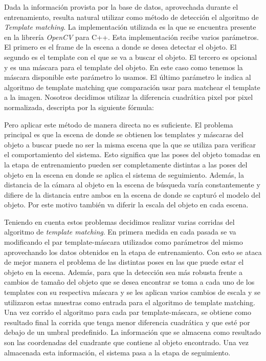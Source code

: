 
Dada la información provista por la base de datos, aprovechada durante el entrenamiento, resulta natural utilizar como método de detección el algoritmo de \textit{Template matching}.  La implementación utilizada es la que se encuentra presente en la librería \textit{OpenCV} para C++. Esta implementación recibe varios parámetros. El primero es el frame de la escena a donde se desea detectar el objeto. El segundo es el template con el que se va a buscar el objeto. El tercero es opcional y es una máscara para el template del objeto. En este caso como tenemos la máscara disponible este parámetro lo usamos. El último parámetro le indica al algoritmo de template matching que comparación usar para matchear el template a la imagen. Nosotros decidimos utilizar la diferencia cuadrática pixel por pixel normalizada, descripta por la siguiente fórmula:

Pero aplicar este método de manera directa no es suficiente. El problema principal es que la escena de donde se obtienen los templates y máscaras del objeto a buscar puede no ser la misma escena que la que se utiliza para verificar el comportamiento del sistema. Esto significa que las poses del objeto tomadas en la etapa de entrenamiento pueden ser completamente distintas a las poses del objeto en la escena en donde se aplica el sistema de seguimiento. Además, la distancia de la cámara al objeto en la escena de búsqueda varía constantemente y difiere de la distancia entre ambos en la escena de donde se capturó el modelo del objeto. Por este motivo también va diferir la escala del objeto en cada escena.

Teniendo en cuenta estos problemas decidimos realizar varias corridas del algoritmo de \textit{template matching}. En primera medida en cada pasada se va modificando el par template-máscara utilizados como parámetros del mismo aprovechando los datos obtenidos en la etapa de entrenamiento. Con esto se ataca de mejor manera el problema de las distintas poses en las que puede estar el objeto en la escena. Además, para que la detección sea más robusta frente a cambios de tamaño del objeto que se desea encontrar se toma a cada uno de los templates con su respectiva máscara y se les aplican varios cambios de escala y se utilizaron estas muestras como entrada para el algoritmo de template matching. Una vez corrido el algoritmo para cada par template-máscara, se obtiene como resultado final la corrida que tenga menor diferencia cuadrática y que esté por debajo de un umbral predefinido. La información que se almacena como resultado son las coordenadas del cuadrante que contiene al objeto encontrado. Una vez almacenada esta información, el sistema pasa a la etapa de seguimiento.

